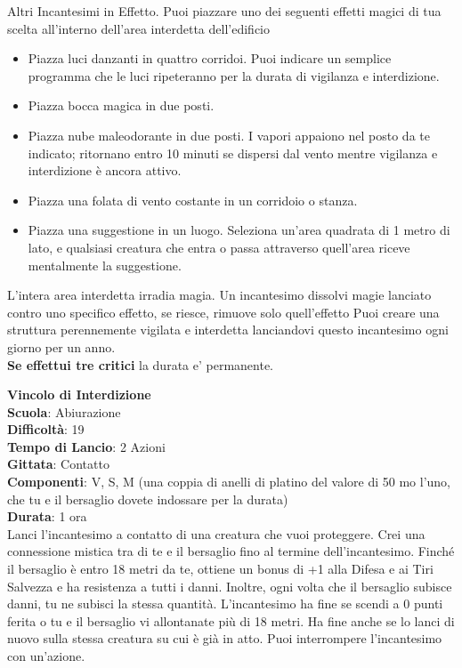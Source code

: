 \begin{multicols}{2}
Altri Incantesimi in Effetto. Puoi piazzare uno dei seguenti effetti magici di tua scelta all'interno dell'area interdetta dell'edificio
\medskip
\begin{itemize}
\item
Piazza luci danzanti in quattro corridoi. Puoi indicare un semplice programma che le luci ripeteranno per la durata di vigilanza e interdizione.
\item
Piazza bocca magica in due posti.
\item
Piazza nube maleodorante in due posti. I vapori appaiono nel posto da te indicato; ritornano entro 10 minuti se dispersi dal vento mentre vigilanza e interdizione è ancora attivo.
\item
Piazza una folata di vento costante in un corridoio o stanza.
\item
Piazza una suggestione in un luogo. Seleziona un'area quadrata di 1 metro di lato, e qualsiasi creatura che entra o passa attraverso quell'area riceve mentalmente la suggestione.
\end{itemize}
\medskip
L'intera area interdetta irradia magia. Un incantesimo dissolvi magie lanciato contro uno specifico effetto, se riesce, rimuove solo quell'effetto Puoi creare una struttura perennemente vigilata e interdetta lanciandovi questo incantesimo ogni giorno per un anno.\\
\textbf{Se effettui tre critici} la durata e' permanente.

\medskip\textbf{Vincolo di Interdizione}\\
\textbf{Scuola}: Abiurazione\\
\textbf{Difficoltà}: 19\\
\textbf{Tempo di Lancio}: 2 Azioni\\
\textbf{Gittata}: Contatto\\
\textbf{Componenti}: V, S, M (una coppia di anelli di platino del valore di 50 mo l'uno, che tu e il bersaglio dovete indossare per la durata)\\
\textbf{Durata}: 1 ora\\
Lanci l'incantesimo a contatto di una creatura che vuoi proteggere. Crei una connessione mistica tra di te e il bersaglio fino al termine dell'incantesimo. Finché il bersaglio è entro 18 metri da te, ottiene un bonus di +1 alla Difesa e ai Tiri Salvezza e ha resistenza a tutti i danni. Inoltre, ogni volta che il bersaglio subisce danni, tu ne subisci la stessa quantità. L'incantesimo ha fine se scendi a 0 punti ferita o tu e il bersaglio vi allontanate più di 18 metri. Ha fine anche se lo lanci di nuovo sulla stessa creatura su cui è già in atto. Puoi interrompere l'incantesimo con un'azione.


\end{multicols}
